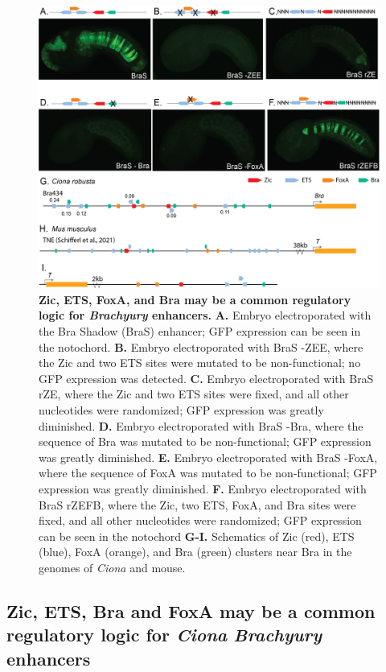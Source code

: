 \begin{figure}[p]
    \centering
    \includegraphics[scale=.74]{2_figures-and-files/Fig5_BraS-Dissection.png}
    \caption[Zic, ETS, FoxA, and Bra may be a common regulatory logic for \textit{Brachyury} enhancers]{\textbf{Zic, ETS, FoxA, and Bra may be a common regulatory logic for \textit{Brachyury} enhancers.} \textbf{A.} Embryo electroporated with the Bra Shadow (BraS) enhancer; GFP expression can be seen in the notochord. \textbf{B.} Embryo electroporated with BraS -ZEE, where the Zic and two ETS sites were mutated to be non-functional; no GFP expression was detected. \textbf{C.} Embryo electroporated with BraS rZE, where the Zic and two ETS sites were fixed, and all other nucleotides were randomized; GFP expression was greatly diminished. \textbf{D.} Embryo electroporated with BraS -Bra, where the sequence of Bra was mutated to be non-functional; GFP expression was greatly diminished. \textbf{E.} Embryo electroporated with BraS -FoxA, where the sequence of FoxA was mutated to be non-functional; GFP expression was greatly diminished. \textbf{F.} Embryo electroporated with BraS rZEFB, where the Zic, two ETS, FoxA, and Bra sites were fixed, and all other nucleotides were randomized; GFP expression can be seen in the notochord \textbf{G-I.} Schematics of Zic (red), ETS (blue), FoxA (orange), and Bra (green) clusters near Bra in the genomes of \textit{Ciona} and mouse. }
    \label{fig:5 brachyury shadow dissection}
\end{figure}

\subsection{Zic, ETS, Bra and FoxA may be a common regulatory logic for \textit{Ciona} \textit{Brachyury} enhancers}

